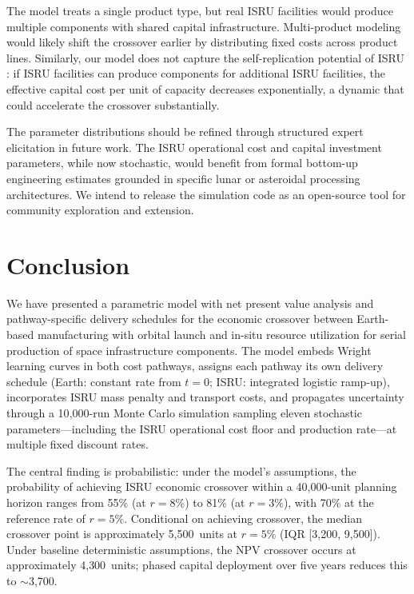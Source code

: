 \documentclass[preprint,12pt]{elsarticle}
\begin{document}
The model treats a single product type, but real ISRU facilities would produce multiple components with shared capital infrastructure. Multi-product modeling would likely shift the crossover earlier by distributing fixed costs across product lines. Similarly, our model does not capture the self-replication potential of ISRU \cite{metzger2013}: if ISRU facilities can produce components for additional ISRU facilities, the effective capital cost per unit of capacity decreases exponentially, a dynamic that could accelerate the crossover substantially.

The parameter distributions should be refined through structured expert elicitation in future work. The ISRU operational cost and capital investment parameters, while now stochastic, would benefit from formal bottom-up engineering estimates grounded in specific lunar or asteroidal processing architectures. We intend to release the simulation code as an open-source tool for community exploration and extension.

\section{Conclusion}
\label{sec:conclusion}

We have presented a parametric model with net present value analysis and pathway-specific delivery schedules for the economic crossover between Earth-based manufacturing with orbital launch and in-situ resource utilization for serial production of space infrastructure components. The model embeds Wright learning curves in both cost pathways, assigns each pathway its own delivery schedule (Earth: constant rate from $t = 0$; ISRU: integrated logistic ramp-up), incorporates ISRU mass penalty and transport costs, and propagates uncertainty through a 10{,}000-run Monte Carlo simulation sampling eleven stochastic parameters---including the ISRU operational cost floor and production rate---at multiple fixed discount rates.

The central finding is probabilistic: under the model's assumptions, the probability of achieving ISRU economic crossover within a 40{,}000-unit planning horizon ranges from 55\% (at $r = 8\%$) to 81\% (at $r = 3\%$), with 70\% at the reference rate of $r = 5\%$. Conditional on achieving crossover, the median crossover point is approximately 5{,}500~units at $r = 5\%$ (IQR [3{,}200, 9{,}500]). Under baseline deterministic assumptions, the NPV crossover occurs at approximately 4{,}300~units; phased capital deployment over five years reduces this to $\sim$3{,}700.
\end{document}
